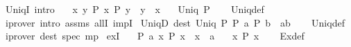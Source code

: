 \begin{isabellebody}
\endisatagproof
{\isafoldproof}%
%
\isadelimproof
%
\endisadelimproof
%
\isadelimdocument
%
\endisadelimdocument
%
\isatagdocument
%
\isamarkuptrue%
%
\endisatagdocument
{\isafolddocument}%
%
\isadelimdocument
%
\endisadelimdocument
{}\isamarkupfalse%
\ Uniq{\isacharunderscore}{\kern0pt}I\ {\isacharbrackleft}{\kern0pt}intro{\isacharquery}{\kern0pt}{\isacharbrackright}{\kern0pt}{\isacharcolon}{\kern0pt}\isanewline
\ \ \ {\isachardoublequoteopen}{\isasymAnd}x\ y{\isachardot}{\kern0pt}\ {\isasymlbrakk}P\ x{\isacharsemicolon}{\kern0pt}\ P\ y{\isasymrbrakk}\ {\isasymLongrightarrow}\ y\ {\isacharequal}{\kern0pt}\ x{\isachardoublequoteclose}\isanewline
\ \ \ {\isachardoublequoteopen}Uniq\ P{\isachardoublequoteclose}\isanewline
%
\isadelimproof
\ \ %
\endisadelimproof
%
\isatagproof
{}\isamarkupfalse%
\ Uniq{\isacharunderscore}{\kern0pt}def\ \isamarkupfalse%
\ {\isacharparenleft}{\kern0pt}iprover\ intro{\isacharcolon}{\kern0pt}\ assms\ allI\ impI{\isacharparenright}{\kern0pt}%
\endisatagproof
{\isafoldproof}%
%
\isadelimproof
\isanewline
%
\endisadelimproof
\isanewline
{}\isamarkupfalse%
\ Uniq{\isacharunderscore}{\kern0pt}D\ {\isacharbrackleft}{\kern0pt}dest{\isacharquery}{\kern0pt}{\isacharbrackright}{\kern0pt}{\isacharcolon}{\kern0pt}\ {\isachardoublequoteopen}{\isasymlbrakk}Uniq\ P{\isacharsemicolon}{\kern0pt}\ P\ a{\isacharsemicolon}{\kern0pt}\ P\ b{\isasymrbrakk}\ {\isasymLongrightarrow}\ a{\isacharequal}{\kern0pt}b{\isachardoublequoteclose}\isanewline
%
\isadelimproof
\ \ %
\endisadelimproof
%
\isatagproof
{}\isamarkupfalse%
\ Uniq{\isacharunderscore}{\kern0pt}def\ \isamarkupfalse%
\ {\isacharparenleft}{\kern0pt}iprover\ dest{\isacharcolon}{\kern0pt}\ spec\ mp{\isacharparenright}{\kern0pt}%
\endisatagproof
{\isafoldproof}%
%
\isadelimproof
\isanewline
%
\endisadelimproof
\isanewline
{}\isamarkupfalse%
\ ex{}I{\isacharcolon}{\kern0pt}\isanewline
\ \ \ {\isachardoublequoteopen}P\ a{\isachardoublequoteclose}\ {\isachardoublequoteopen}{\isasymAnd}x{\isachardot}{\kern0pt}\ P\ x\ {\isasymLongrightarrow}\ x\ {\isacharequal}{\kern0pt}\ a{\isachardoublequoteclose}\isanewline
\ \ \ {\isachardoublequoteopen}{\isasymexists}{\isacharbang}{\kern0pt}x{\isachardot}{\kern0pt}\ P\ x{\isachardoublequoteclose}\isanewline
%
\isadelimproof
\ \ %
\endisadelimproof
%
\isatagproof
{}\isamarkupfalse%
\ Ex{}{\isacharunderscore}{\kern0pt}def\ \isamarkupfalse%

\end{isabellebody}
